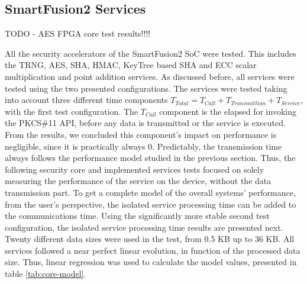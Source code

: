 \subsection{SmartFusion2 Services}\label{chap:evaluation:board}

TODO - AES FPGA core test results!!!!

All the security accelerators of the SmartFusion2 SoC were tested. This includes the TRNG, AES, SHA, HMAC, KeyTree based SHA and ECC scalar multiplication and point addition services.
As discussed before, all services were tested using the two presented configurations. The services were tested taking into account three different time components \(T_{Total} = T_{Call} + T_{Transmittion} + T_{Service}\), with the first test configuration. The \(T_{Call}\) component is the elapsed for invoking the PKCS\#11 API, before any data is transmitted or the service is executed. From the results, we concluded this component's impact on performance is negligible, since it is practically always 0.
Predictably, the transmission time always follows the performance model studied in the previous section.
Thus, the following security core and implemented services tests focused on solely measuring the performance of the service on the device, without the data transmission part. To get a complete model of the overall systems' performance, from the user's perspective, the isolated service processing time can be added to the communications time.
Using the significantly more stable second test configuration, the isolated service processing time results are presented next.
Twenty different data sizes were used in the test, from 0.5 KB up to 36 KB.
All services followed a near perfect linear evolution, in function of the processed data size. Thus, linear regression was used to calculate the model values, presented in table \ref{tab:core-model}.



